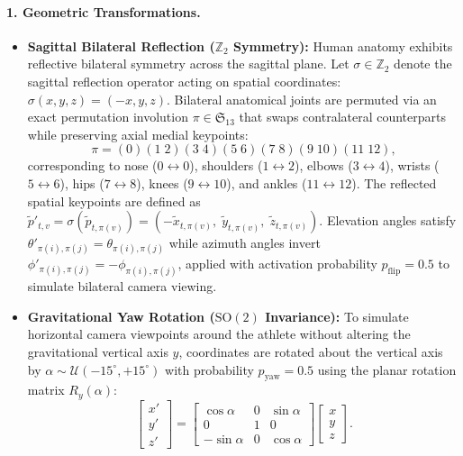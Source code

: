 \documentclass[preprint,12pt]{elsarticle}
\begin{document}
\paragraph{1. Geometric Transformations.}
\begin{itemize}
    \item \textbf{Sagittal Bilateral Reflection ($\mathbb{Z}_2$ Symmetry):} Human anatomy exhibits reflective bilateral symmetry across the sagittal plane. Let $\sigma \in \mathbb{Z}_2$ denote the sagittal reflection operator acting on spatial coordinates: $\sigma(x, y, z) = (-x, y, z)$. Bilateral anatomical joints are permuted via an exact permutation involution $\pi \in \mathfrak{S}_{13}$ that swaps contralateral counterparts while preserving axial medial keypoints:
    \begin{equation}
        \pi = (0)(1 \; 2)(3 \; 4)(5 \; 6)(7 \; 8)(9 \; 10)(11 \; 12),
    \end{equation}
    corresponding to nose ($0 \leftrightarrow 0$), shoulders ($1 \leftrightarrow 2$), elbows ($3 \leftrightarrow 4$), wrists ($5 \leftrightarrow 6$), hips ($7 \leftrightarrow 8$), knees ($9 \leftrightarrow 10$), and ankles ($11 \leftrightarrow 12$). The reflected spatial keypoints are defined as $\tilde{p}'_{t, v} = \sigma( \tilde{p}_{t, \pi(v)} ) = ( -\tilde{x}_{t, \pi(v)}, \; \tilde{y}_{t, \pi(v)}, \; \tilde{z}_{t, \pi(v)} )$. Elevation angles satisfy $\theta'_{\pi(i), \pi(j)} = \theta_{\pi(i), \pi(j)}$ while azimuth angles invert $\phi'_{\pi(i), \pi(j)} = -\phi_{\pi(i), \pi(j)}$, applied with activation probability $p_{\text{flip}} = 0.5$ to simulate bilateral camera viewing.
    \item \textbf{Gravitational Yaw Rotation ($\mathrm{SO}(2)$ Invariance):} To simulate horizontal camera viewpoints around the athlete without altering the gravitational vertical axis $y$, coordinates are rotated about the vertical axis by $\alpha \sim \mathcal{U}(-15^\circ, +15^\circ)$ with probability $p_{\text{yaw}} = 0.5$ using the planar rotation matrix $R_y(\alpha)$:
    \begin{equation}
    \label{eq:yaw_rotation}
        \begin{bmatrix} x' \\ y' \\ z' \end{bmatrix} = \begin{bmatrix} \cos\alpha & 0 & \sin\alpha \\ 0 & 1 & 0 \\ -\sin\alpha & 0 & \cos\alpha \end{bmatrix} \begin{bmatrix} x \\ y \\ z \end{bmatrix}.

\end{equation}
\end{itemize}
\end{document}

